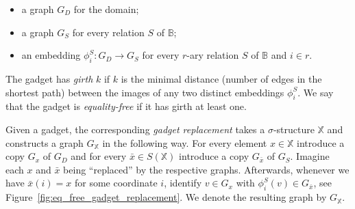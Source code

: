 \documentclass[oneside]{amsart}
\newcommand{\str}[1]{\mathbb{#1}}
\begin{document}
\begin{itemize}
    \item a graph $G_D$ for the domain;
    \item a graph $G_S$ for every relation $S$ of $\str B$;
    \item an embedding $\phi^S_i\colon G_D\to G_S$ 
    for every $r$-ary relation $S$ of $\str B$ and $i\in r$.
\end{itemize}


The gadget has \emph{girth} $k$ if $k$ is the minimal distance (number of edges in the shortest path) between the images of any two distinct embeddings $\phi_i^S$.
We say that the gadget is \emph{equality-free} if it has girth at least one.

Given a gadget, the corresponding \emph{gadget replacement} takes a $\sigma$-structure $\str X$ and constructs a graph $G_\str X$ in the following way.
For every element $x\in \str X$ introduce a copy $G_x$ of $G_D$ and for every $\bar x\in S(\str X)$ introduce a copy $G_{\bar x}$ of $G_S$. Imagine each $x$ and $\bar x$ being ``replaced'' by the respective graphs. Afterwards, whenever we have $\bar x(i) = x$ for some coordinate $i$, identify $v\in G_x$ with 
$\phi_i^S(v)\in G_{\bar x}$, see Figure~\ref{fig:eq_free_gadget_replacement}. We denote the resulting graph by $G_\str X$.
\end{document}
